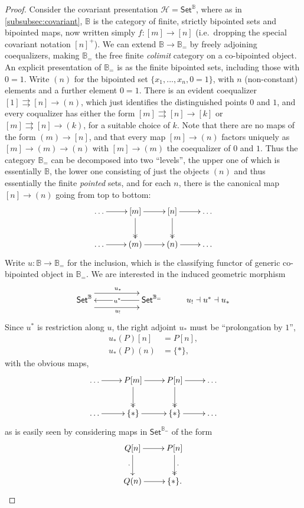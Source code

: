 \documentclass[11pt]{article}
\newcommand{\B}{\ensuremath{\mathbb{B}}}
\newcommand{\Set}{\ensuremath{\mathsf{Set}}}
\newcommand{\HH}{\ensuremath{\mathcal{H}}}
\theoremstyle{remark}
\theoremstyle{definition}
\begin{document}
\begin{proof}
Consider the covariant presentation $\HH = \Set^\B$, where as in \ref{subsubsec:covariant}, $\B$ is the category of finite, strictly bipointed sets and bipointed maps, now written simply $f: [m]\to [n]$ (i.e.\ dropping the special covariant notation $[n]^+$).  We can extend $\B\to\B_=$ by freely adjoining coequalizers, making $\B_=$ the free finite \emph{colimit} category on a co-bipointed object. An explicit presentation of $\B_=$ is as the finite bipointed sets, including those with $0=1$.  Write $(n)$ for the bipointed set $\{x_1, ..., x_n, 0=1\}$, with $n$ (non-constant) elements and a further element $0=1$.  There is an evident coequalizer $[1]\rightrightarrows [n]\to(n)$, which just identifies the distinguished points $0$ and $1$, and every coqualizer has either the form $[m]\rightrightarrows [n]\to [k]$ or $[m]\rightrightarrows [n]\to(k)$, for a suitable choice of $k$.  Note that there are no maps of the form $(m)\to [n]$, and that every map $[m]\to (n)$ factors uniquely as $[m]\to (m)\to (n)$ with  $[m]\to(m)$ the coequalizer of $0$ and $1$.  Thus the category $\B_=$ can be decomposed into two ``levels'', the upper one of which is essentially $\B$, the lower one consisting of just the objects $(n)$ and thus essentially the finite \emph{pointed} sets, and for each $n$, there is the canonical map $[n]\to(n)$ going from top to bottom:
\[
\xymatrix{
\dots \ar[r] & [m] \ar@{->>}[d] \ar[r] & [n] \ar@{->>}[d] \ar[r] & \dots \\
\dots \ar[r] & (m) \ar[r] & (n) \ar[r] & \dots
}
\]
Write $u : \B\to\B_=$ for the inclusion, which is the classifying functor of generic co-bipointed object in $\B_=$.  We are interested in the induced geometric morphism
\[
\xymatrix{
\Set^\B \ar@<-2ex>[rr]_{u_!} \ar@<2ex>[rr]^{u_*} && \ar[ll]|-{\,u^*} \Set^{\B_=}  & u_! \dashv u^* \dashv u_*
}
\]
Since $u^*$ is restriction along $u$, the right adjoint $u_*$ must be ``prolongation by $1$'',
\begin{align*}
u_*(P)[n] &= P[n],\\
u_*(P)(n) &= \{*\},
\end{align*}
with the obvious maps,
\[
\xymatrix{
\dots \ar[r] & P[m] \ar@{->>}[d] \ar[r] & P[n] \ar@{->>}[d] \ar[r] & \dots \\
\dots \ar[r] & \{*\} \ar[r] & \{*\} \ar[r] & \dots
}
\]
as is easily seen by considering maps in $\Set^{\B_=}$ of the form
\[
\xymatrix{
 Q[n] \ar[d]_{\cdot} \ar[r] & P[n] \ar@{->>}[d]^{\cdot} \\
 Q(n) \ar[r]^{} & \{*\} .
}
\]

\end{proof}
\end{document}
